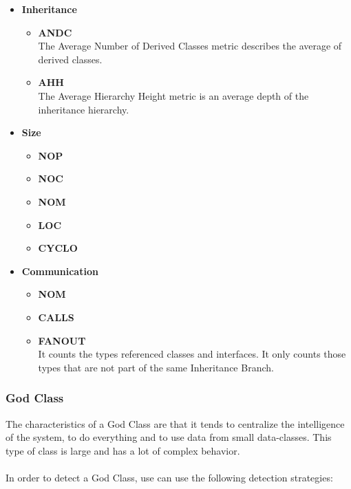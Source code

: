 \documentclass{article}
\begin{document}
\begin{itemize}
	\item \textbf{Inheritance}
	\begin{itemize}
		\item \textbf{ANDC}
		\vspace{.2cm} \\
		The Average Number of Derived Classes metric describes the average of derived classes.
	
		\item \textbf{AHH}
		\vspace{.2cm} \\
		The Average Hierarchy Height metric is an average depth of the inheritance hierarchy.
	\end{itemize}
	
	\item \textbf{Size}
	\begin{itemize}
		\item \textbf{NOP}
		
		\item \textbf{NOC}
		
		\item \textbf{NOM}
		
		\item \textbf{LOC}
		
		\item \textbf{CYCLO}
	\end{itemize}
	
	\item \textbf{Communication}
	\begin{itemize}
		\item \textbf{NOM}
		
		\item \textbf{CALLS}
		
		\item \textbf{FANOUT}
		\vspace{.2cm} \\
		It counts the types referenced classes and interfaces. It only counts those types that are not part of the same Inheritance Branch.
	\end{itemize}
\end{itemize}

\subsubsection{God Class}
The characteristics of a God Class are that it tends to centralize the intelligence of the system, to do everything and to use data from small data-classes. This type of class is large and has a lot of complex behavior. \\ \\
In order to detect a God Class, use can use the following detection strategies:
\end{document}
